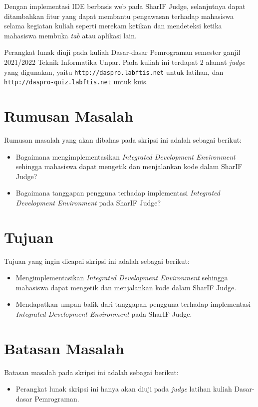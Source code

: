Dengan implementasi IDE berbasis web pada SharIF Judge, selanjutnya dapat ditambahkan fitur yang dapat membantu pengawasan terhadap mahasiswa selama kegiatan kuliah seperti merekam ketikan dan mendeteksi ketika mahasiswa membuka \textit{tab} atau aplikasi lain.

Perangkat lunak diuji pada kuliah Dasar-dasar Pemrograman semester ganjil 2021/2022 \linebreak Teknik Informatika Unpar. Pada kuliah ini terdapat 2 alamat \textit{judge} yang digunakan, yaitu \linebreak \texttt{http://daspro.labftis.net} untuk latihan, dan \texttt{http://daspro-quiz.labftis.net} untuk kuis.

\section{Rumusan Masalah}
\label{sec:rumusan}
Rumusan masalah yang akan dibahas pada skripsi ini adalah sebagai berikut:
\begin{itemize}
	\item Bagaimana mengimplementasikan {\it Integrated Development Environment} sehingga mahasiswa dapat mengetik dan menjalankan kode dalam SharIF Judge?
	\item Bagaimana tanggapan pengguna terhadap implementasi {\it Integrated Development Environment} pada SharIF Judge? 
\end{itemize}


\section{Tujuan}
\label{sec:tujuan}
Tujuan yang ingin dicapai skripsi ini adalah sebagai berikut:
\begin{itemize}
	\item Mengimplementasikan {\it Integrated Development Environment} sehingga mahasiswa dapat mengetik dan menjalankan kode dalam SharIF Judge.
	\item Mendapatkan umpan balik dari tanggapan pengguna terhadap implementasi {\it Integrated Development Environment} pada SharIF Judge.
\end{itemize}

\section{Batasan Masalah}
\label{sec:batasan}
Batasan masalah pada skripsi ini adalah sebagai berikut:
\begin{itemize}
    \item Perangkat lunak skripsi ini hanya akan diuji pada \textit{judge} latihan kuliah Dasar-dasar Pemrograman.
\end{itemize}

